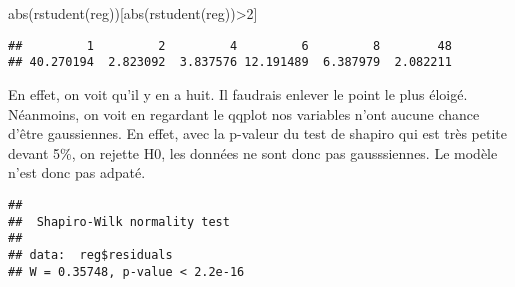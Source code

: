 \documentclass[
]{article}
\newenvironment{Shaded}{\begin{snugshade}}{\end{snugshade}}
\newcommand{\DecValTok}[1]{\textcolor[rgb]{0.00,0.00,0.81}{#1}}
\newcommand{\FunctionTok}[1]{\textcolor[rgb]{0.00,0.00,0.00}{#1}}
\newcommand{\NormalTok}[1]{#1}
\newcommand{\SpecialCharTok}[1]{\textcolor[rgb]{0.00,0.00,0.00}{#1}}
\begin{document}
\begin{Shaded}
\begin{Highlighting}[]
\FunctionTok{abs}\NormalTok{(}\FunctionTok{rstudent}\NormalTok{(reg))[}\FunctionTok{abs}\NormalTok{(}\FunctionTok{rstudent}\NormalTok{(reg))}\SpecialCharTok{\textgreater{}}\DecValTok{2}\NormalTok{]}
\end{Highlighting}
\end{Shaded}

\begin{verbatim}
##         1         2         4         6         8        48 
## 40.270194  2.823092  3.837576 12.191489  6.387979  2.082211
\end{verbatim}

En effet, on voit qu'il y en a huit. Il faudrais enlever le point le
plus éloigé. Néanmoins, on voit en regardant le qqplot nos variables
n'ont aucune chance d'être gaussiennes. En effet, avec la p-valeur du
test de shapiro qui est très petite devant 5\%, on rejette H0, les
données ne sont donc pas gausssiennes. Le modèle n'est donc pas adpaté.

\begin{Shaded}
\end{Shaded}

\begin{verbatim}
## 
##  Shapiro-Wilk normality test
## 
## data:  reg$residuals
## W = 0.35748, p-value < 2.2e-16
\end{verbatim}
\end{document}
